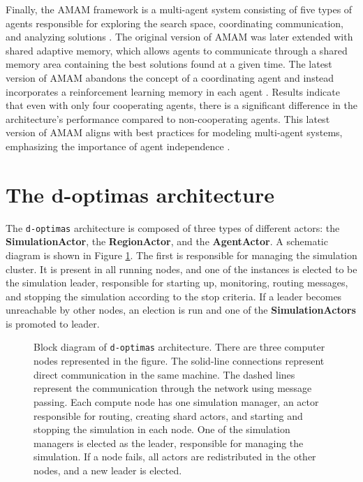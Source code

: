\documentclass[preprint,12pt]{elsarticle}
\begin{document}
Finally, the AMAM framework is a multi-agent system consisting of five types of agents responsible for exploring the search space, coordinating communication, and analyzing solutions \cite{silva2007}. The original version of AMAM was later extended with shared adaptive memory, which allows agents to communicate through a shared memory area containing the best solutions found at a given time. The latest version of AMAM abandons the concept of a coordinating agent and instead incorporates a reinforcement learning memory in each agent \cite{fernandes2009}. Results indicate that even with only four cooperating agents, there is a significant difference in the architecture's performance compared to non-cooperating agents. This latest version of AMAM aligns with best practices for modeling multi-agent systems, emphasizing the importance of agent independence \cite{silva2015}.


\section{The d-optimas architecture}
\label{sec:architecture}
The \texttt{d-optimas} architecture is composed of three types of different actors: the \textbf{SimulationActor}, the \textbf{RegionActor}, and the \textbf{AgentActor}. A schematic diagram is shown in Figure \ref{fig:d-optimas-new}. The first is responsible for managing the simulation cluster. It is present in all running nodes, and one of the instances is elected to be the simulation leader, responsible for starting up, monitoring, routing messages, and stopping the simulation according to the stop criteria. If a leader becomes unreachable by other nodes, an election is run and one of the \textbf{SimulationActors} is promoted to leader. 

\begin{figure}
    \centering
    
    \caption{Block diagram of \texttt{d-optimas} architecture. There are three computer nodes represented in the figure. The solid-line connections represent direct communication in the same machine. The dashed lines represent the communication through the network using message passing.  Each compute node has one simulation manager, an actor responsible for routing, creating shard actors, and starting and stopping the simulation in each node. One of the simulation managers is elected as the leader, responsible for managing the simulation. If a node fails, all actors are redistributed in the other nodes, and a new leader is elected.}
    \label{fig:d-optimas-new}
\end{figure}
\end{document}
